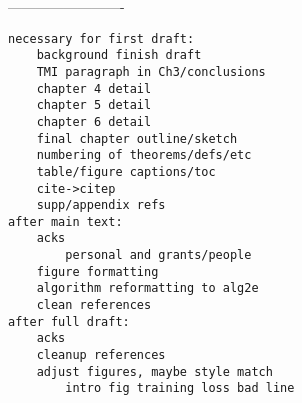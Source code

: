 -------------------------

\begin{verbatim}
necessary for first draft:
	background finish draft
	TMI paragraph in Ch3/conclusions
	chapter 4 detail
	chapter 5 detail
	chapter 6 detail
	final chapter outline/sketch
    numbering of theorems/defs/etc
	table/figure captions/toc
	cite->citep
	supp/appendix refs
after main text:
    acks
    	personal and grants/people
    figure formatting
    algorithm reformatting to alg2e
    clean references
after full draft:
	acks
	cleanup references
	adjust figures, maybe style match
		intro fig training loss bad line
\end{verbatim}

